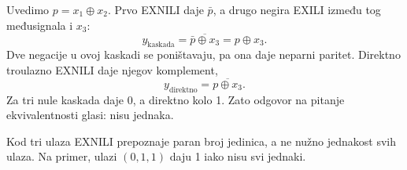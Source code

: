 
Uvedimo \(p=x_1\oplus x_2\). Prvo EXNILI daje \(\bar{p}\), a drugo negira EXILI između tog međusignala i \(x_3\):
\[
y_{\mathrm{kaskada}}
 =\overline{\bar{p}\oplus x_3}
 =p\oplus x_3.
\]
Dve negacije u ovoj kaskadi se poništavaju, pa ona daje neparni paritet. Direktno troulazno EXNILI daje njegov komplement,
\[
y_{\mathrm{direktno}}=\overline{p\oplus x_3}.
\]
Za tri nule kaskada daje 0, a direktno kolo 1. Zato odgovor na pitanje ekvivalentnosti glasi: nisu jednaka.

Kod tri ulaza EXNILI prepoznaje paran broj jedinica, a ne nužno jednakost svih ulaza. Na primer, ulazi \((0,1,1)\) daju 1 iako nisu svi jednaki.
